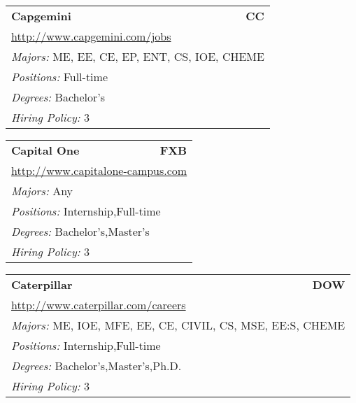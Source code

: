 \documentclass[twoside]{article}
\begin{document}
\begin{center}
\begin{multicols}{3}
\begin{FlushLeft}
\begin{minipage}{\columnwidth}
\end{minipage}
 
\begin{minipage}{\columnwidth}\begin{tabularx}{.95\columnwidth}{Xr}
                 {\Large\bf Capgemini} & {\Large\bf CC}\\
    \multicolumn{2}{p{.95\columnwidth}}{\url{http://www.capgemini.com/jobs}}\\
    \multicolumn{2}{p{.95\columnwidth}}{\emph{Majors:} ME, EE, CE, EP, ENT, CS, IOE, CHEME}\\
    \multicolumn{2}{p{.95\columnwidth}}{\emph{Positions:} Full-time}\\
    \multicolumn{2}{p{.95\columnwidth}}{\emph{Degrees:} Bachelor's}\\
    \multicolumn{2}{p{.95\columnwidth}}{\emph{Hiring Policy:} 3}\\
    \end{tabularx}
    
\end{minipage}
 
\begin{minipage}{\columnwidth}\begin{tabularx}{.95\columnwidth}{Xr}
                 {\Large\bf Capital One} & {\Large\bf FXB}\\
    \multicolumn{2}{p{.95\columnwidth}}{\url{http://www.capitalone-campus.com}}\\
    \multicolumn{2}{p{.95\columnwidth}}{\emph{Majors:} Any}\\
    \multicolumn{2}{p{.95\columnwidth}}{\emph{Positions:} Internship,Full-time}\\
    \multicolumn{2}{p{.95\columnwidth}}{\emph{Degrees:} Bachelor's,Master's}\\
    \multicolumn{2}{p{.95\columnwidth}}{\emph{Hiring Policy:} 3}\\
    \end{tabularx}
    
\end{minipage}
 
\begin{minipage}{\columnwidth}\begin{tabularx}{.95\columnwidth}{Xr}
                 {\Large\bf Caterpillar} & {\Large\bf DOW}\\
    \multicolumn{2}{p{.95\columnwidth}}{\url{http://www.caterpillar.com/careers}}\\
    \multicolumn{2}{p{.95\columnwidth}}{\emph{Majors:} ME, IOE, MFE, EE, CE, CIVIL, CS, MSE, EE:S, CHEME}\\
    \multicolumn{2}{p{.95\columnwidth}}{\emph{Positions:} Internship,Full-time}\\
    \multicolumn{2}{p{.95\columnwidth}}{\emph{Degrees:} Bachelor's,Master's,Ph.D.}\\
    \multicolumn{2}{p{.95\columnwidth}}{\emph{Hiring Policy:} 3}\\
    \end{tabularx}
    

\end{minipage}
\end{FlushLeft}
\end{multicols}
\end{center}
\end{document}
